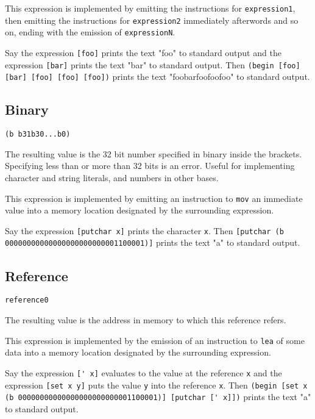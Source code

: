 \documentclass[twocolumn,landscape]{article}
\begin{document}
      This expression is implemented by emitting the instructions for \lstinline{expression1}, then emitting the instructions for \lstinline{expression2} immediately afterwords and so on, ending with the emission of \lstinline{expressionN}.

      Say the expression \lstinline{[foo]} prints the text "foo" to standard output and the expression \lstinline{[bar]} prints the text "bar" to standard output. Then \lstinline{(begin [foo] [bar] [foo] [foo] [foo])} prints the text "foobarfoofoofoo" to standard output.

    \subsection{Binary}\label{sec:binary}
      \begin{lstlisting}
(b b31b30...b0)
      \end{lstlisting}
      The resulting value is the 32 bit number specified in binary inside the brackets. Specifying less than or more than 32 bits is an error. Useful for implementing character and string literals, and numbers in other bases.

      This expression is implemented by emitting an instruction to \lstinline{mov} an immediate value into a memory location designated by the surrounding expression.

      Say the expression \lstinline{[putchar x]} prints the character \lstinline{x}. Then \lstinline{[putchar (b 00000000000000000000000001100001)]} prints the text "a" to standard output.

    \subsection{Reference}\label{sec:reference}
      \begin{lstlisting}
reference0
      \end{lstlisting}
      The resulting value is the address in memory to which this reference refers.

      This expression is implemented by the emission of an instruction to \lstinline{lea} of some data into a memory location designated by the surrounding expression.

      Say the expression \lstinline{[' x]} evaluates to the value at the reference \lstinline{x} and the expression \lstinline{[set x y]} puts the value \lstinline{y} into the reference \lstinline{x}. Then \lstinline{(begin [set x (b 00000000000000000000000001100001)] [putchar [' x]])} prints the text "a" to standard output.
\end{document}

